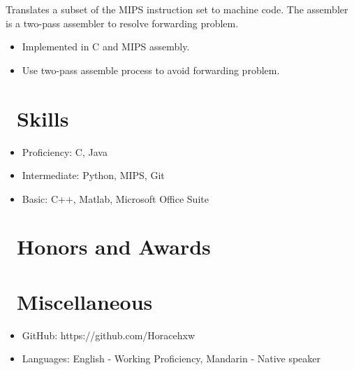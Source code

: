 \documentclass{resume}
\begin{document}
Translates a subset of the MIPS instruction set to machine code. The assembler is a two-pass assembler to resolve forwarding problem.
\begin{itemize}
  \item Implemented in C and MIPS assembly.
  \item Use two-pass assemble process to avoid forwarding problem.
\end{itemize}


\section{\faCogs\ Skills}
\begin{itemize}[parsep=0.5ex]
  \item Proficiency: C, Java
  \item Intermediate: Python, MIPS, Git
  \item Basic: C++, Matlab, Microsoft Office Suite
\end{itemize}

\section{\faHeartO\ Honors and Awards}

\section{\faInfo\ Miscellaneous}
\begin{itemize}[parsep=0.5ex]
  \item GitHub: https://github.com/Horacehxw
  \item Languages: English - Working Proficiency, Mandarin - Native speaker
\end{itemize}

%
%
\end{document}
